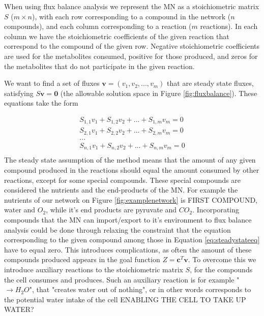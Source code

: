 \documentclass[10pt,a4paper]{article}
\begin{document}
	When using flux balance analysis we represent the MN as a stoichiometric matrix $S$ ($m\times n$), with each row corresponding to a compound in the network ($n$ compounds), and each column corresponding to a reaction ($m$ reactions). In each column we have the stoichiometric coefficients of the given reaction that correspond to the compound of the given row. Negative stoichiometric coefficients are used for the metabolites consumed, positive for those produced, and zeros for the metabolites that do not participate in the given reaction.
	
	We want to find a set of fluxes  $\mathbf{v}=\left( v_1,v_2,...,v_m \right)$ that are steady state fluxes, satisfying $S\mathbf{v}=\mathbf{0}$ (the allowable solution space in Figure \ref{fig:fluxbalance}). These equations take the form
	
	\begin{equation}\label{eq:steadystateeq}
		\begin{matrix}
			S_{1,1} v_1 + S_{1,2} v_2 + ... + S_{1,m} v_m=0 \\
			S_{2,1} v_1 + S_{2,2} v_2 + ... + S_{2,m} v_m=0 \\
			... \\
			S_{n,1} v_1 + S_{n,2} v_2 + ... + S_{n,m} v_m=0 \\
		\end{matrix}
	\end{equation}
	The steady state assumption of the method means that the amount of any given compound produced in the reactions should equal the amount consumed by other reactions, except for some special compounds. These special compounds are considered the nutrients and the end-products of the MN. For example the nutrients of our network on Figure \ref {fig:examplenetwork} is FIRST COMPOUND, water and $O_2$, while it's end products are pyruvate and $CO_2$. Incorporating compounds that the MN can import/export to it's environment to flux balance analysis could be done through relaxing the constraint that the equation corresponding to the given compound among those in Equation \ref{eq:steadystateeq} have to equal zero. This introduces complications, as often the amount of these compounds produced appears in the goal function  $Z=\mathbf{c}^T \mathbf{v}$. To overcome this we introduce auxiliary reactions to the stoichiometric matrix $S$, for the compounds the cell consumes and produces. Such an auxiliary reaction is for example " $ \rightarrow H_2O$", that "creates water out of nothing", or in other words corresponds to the potential water intake of the cell ENABLING THE CELL TO TAKE UP WATER?
\end{document}

